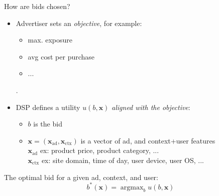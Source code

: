 \documentclass{beamer}
\DeclareMathOperator*{\argmax}{argmax}
\def\vx{\boldsymbol x}
\begin{document}
\begin{frame}[t]{How are bids chosen?}
    \begin{itemize}
        \item \pause Advertiser sets an \emph{objective}\pause, for example:
        \begin{itemize}
            \item max. exposure
            \item avg cost per purchase
            \item...
        \end{itemize}.
        \item \pause DSP defines a utility $u(b, \vx)$ \emph{aligned with the objective}: 
        \begin{itemize}
            \item $b$ is the bid
            \item $\vx = (\vx_{\mathrm{ad}}, \vx_{\mathrm{ctx}})$ is a vector of ad, and context+user features \\\pause
            $\vx_{\mathrm{ad}}$ ex: product price, product category, ... \\
            $\vx_{\mathrm{ctx}}$ ex: site domain, time of day, user device, user OS, ...
        \end{itemize}
    \end{itemize}
    \vfill\pause
    The optimal bid for a given ad, context, and user:
    \[
    b^*(\vx) =\argmax_b u(b, \vx)
    \]
\end{frame}
\end{document}
